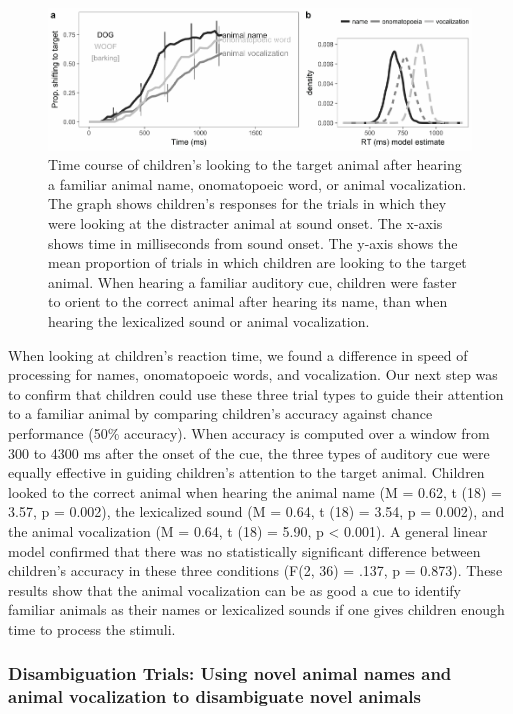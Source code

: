 \documentclass[english,floatsintext,man]{apa6}
\theoremstyle{definition}
\theoremstyle{definition}
\theoremstyle{definition}
\theoremstyle{remark}
\begin{document}
\begin{figure}
\includegraphics[width=1\linewidth]{anime_manuscript_files/figure-latex/unnamed-chunk-6-1} \caption{Time course of children’s looking to the target animal after hearing a familiar animal name, onomatopoeic word, or animal vocalization. The graph shows children's responses for the trials in which they were looking at the distracter animal at sound onset. The x-axis shows time in milliseconds from sound onset. The y-axis shows the mean proportion of trials in which children are looking to the target animal. When hearing a familiar auditory cue, children were faster to orient to the correct animal after hearing its name, than when hearing the lexicalized sound or animal vocalization.}\label{fig:unnamed-chunk-6}
\end{figure}

When looking at children's reaction time, we found a difference in speed
of processing for names, onomatopoeic words, and vocalization. Our next
step was to confirm that children could use these three trial types to
guide their attention to a familiar animal by comparing children's
accuracy against chance performance (50\% accuracy). When accuracy is
computed over a window from 300 to 4300 ms after the onset of the cue,
the three types of auditory cue were equally effective in guiding
children's attention to the target animal. Children looked to the
correct animal when hearing the animal name (M = 0.62, t (18) = 3.57, p
= 0.002), the lexicalized sound (M = 0.64, t (18) = 3.54, p = 0.002),
and the animal vocalization (M = 0.64, t (18) = 5.90, p \textless{}
0.001). A general linear model confirmed that there was no statistically
significant difference between children's accuracy in these three
conditions (F(2, 36) = .137, p = 0.873). These results show that the
animal vocalization can be as good a cue to identify familiar animals as
their names or lexicalized sounds if one gives children enough time to
process the stimuli.

\subsubsection{Disambiguation Trials: Using novel animal names and
animal vocalization to disambiguate novel
animals}\label{disambiguation-trials-using-novel-animal-names-and-animal-vocalization-to-disambiguate-novel-animals}
\end{document}
